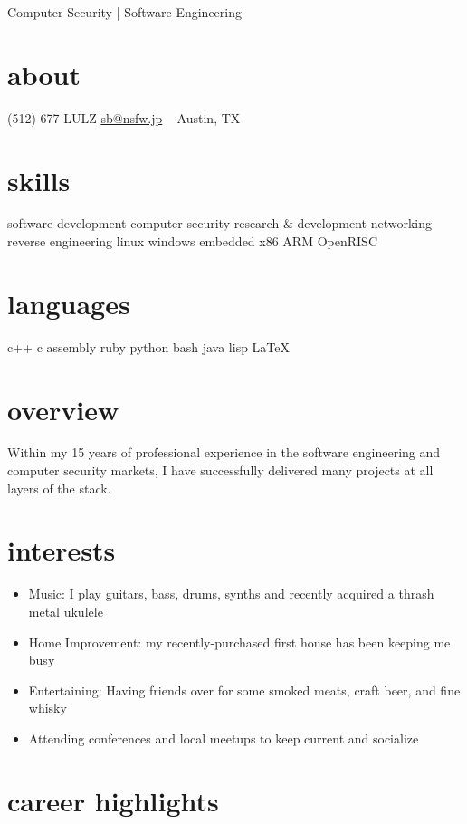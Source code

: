 \documentclass[]{friggeri-cv}
\begin{document}
       {Computer Security | Software Engineering}

\begin{aside}
  \section{about}
  (512) 677-LULZ
  \href{mailto:sb@nsfw.jp}{sb@nsfw.jp}
  ~
  Austin, TX
  \section{skills}
  software development
  computer security
  research \& development
  networking
  reverse engineering
  linux
  windows
  embedded
  x86
  ARM
  OpenRISC
  \section{languages}
  c++
  c
  assembly
  ruby
  python
  bash
  java
  lisp
  \LaTeX
\end{aside}

\section{overview}

Within my 15 years of professional experience in the software
engineering and computer security markets, I have successfully
delivered many projects at all layers of the stack. 

\section{interests}

\begin{itemize}
\item{Music: I play guitars, bass, drums, synths and recently
  acquired a thrash metal ukulele}
\item{Home Improvement: my recently-purchased first house has been keeping me busy}
\item{Entertaining: Having friends over for some smoked meats, craft
  beer, and fine whisky}
\item{Attending conferences and local meetups to keep current
  and socialize}
\end{itemize}

\section{career highlights}
\end{document}
